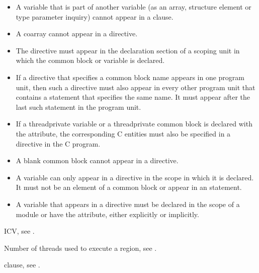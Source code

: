 \begin{fortranspecific}
\begin{itemize}
\item A variable that is part of another variable (as an array, structure element 
      or type parameter inquiry) cannot appear in a  clause.
\item A coarray cannot appear in a  directive.
\item The  directive must appear in the declaration section 
      of a scoping unit in which the common block or variable is declared.
\item If a  directive that specifies a common block name appears 
      in one program unit, then such a directive must also appear in every other 
      program unit that contains a  statement that specifies the same 
      name. It must appear after the last such  statement in the 
      program unit.
\item If a threadprivate variable or a threadprivate common block is declared
      with the  attribute, the corresponding C entities must also be 
      specified in a  directive in the C program.
\item A blank common block cannot appear in a  directive.
\item A variable can only appear in a  directive in the 
      scope in which it is declared. It must not be an element of a common block 
      or appear in an  statement.
\item A variable that appears in a  directive must be declared 
      in the scope of a module or have the  attribute, either explicitly 
      or implicitly.
\end{itemize}
\end{fortranspecific}

\begin{crossrefs}
\item {} ICV, see
.

\item Number of threads used to execute a  region, see
.

\item {} clause, see
.
\end{crossrefs}



